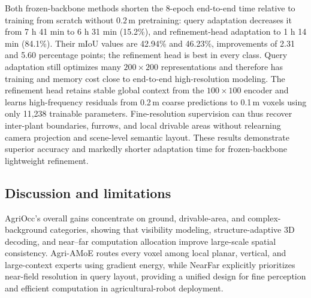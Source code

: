 \documentclass[a4paper,fleqn]{cas-sc}
\begin{document}
Both frozen-backbone methods shorten the 8-epoch end-to-end time relative to training from scratch without $0.2\,\mathrm{m}$ pretraining: query adaptation decreases it from 7 h 41 min to 6 h 31 min (15.2\%), and refinement-head adaptation to 1 h 14 min (84.1\%). Their mIoU values are 42.94\% and 46.23\%, improvements of 2.31 and 5.60 percentage points; the refinement head is best in every class. Query adaptation still optimizes many $200\times200$ representations and therefore has training and memory cost close to end-to-end high-resolution modeling. The refinement head retains stable global context from the $100\times100$ encoder and learns high-frequency residuals from 0.2\,m coarse predictions to 0.1\,m voxels using only 11,238 trainable parameters. Fine-resolution supervision can thus recover inter-plant boundaries, furrows, and local drivable areas without relearning camera projection and scene-level semantic layout. These results demonstrate superior accuracy and markedly shorter adaptation time for frozen-backbone lightweight refinement.

\subsection{Discussion and limitations}\label{sec:discussion}
AgriOcc's overall gains concentrate on ground, drivable-area, and complex-background categories, showing that visibility modeling, structure-adaptive 3D decoding, and near--far computation allocation improve large-scale spatial consistency. Agri-AMoE routes every voxel among local planar, vertical, and large-context experts using gradient energy, while NearFar explicitly prioritizes near-field resolution in query layout, providing a unified design for fine perception and efficient computation in agricultural-robot deployment.
\end{document}
